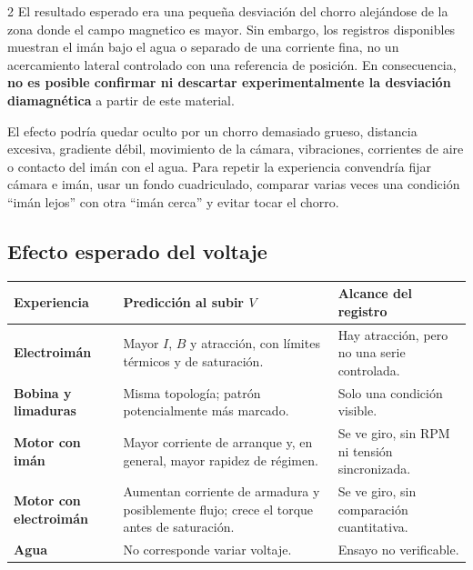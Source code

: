 \documentclass[10pt,letterpaper]{article}
\begin{document}
\begin{multicols}{2}
El resultado esperado era una pequeña desviación del chorro alejándose de la zona donde el campo magnetico es mayor. Sin embargo, los registros disponibles muestran el imán bajo el agua o separado de una corriente fina, no un acercamiento lateral controlado con una referencia de posición. En consecuencia, \textbf{no es posible confirmar ni descartar experimentalmente la desviación diamagnética} a partir de este material.


El efecto podría quedar oculto por un chorro demasiado grueso, distancia excesiva, gradiente débil, movimiento de la cámara, vibraciones, corrientes de aire o contacto del imán con el agua. Para repetir la experiencia convendría fijar cámara e imán, usar un fondo cuadriculado, comparar varias veces una condición ``imán lejos'' con otra ``imán cerca'' y evitar tocar el chorro.

\subsection{Efecto esperado del voltaje}

\begin{center}
\scriptsize
\begin{tabularx}{\columnwidth}{@{}>{\bfseries}p{}XX@{}}
\toprule
Experiencia & Predicción al subir $V$ & Alcance del registro \\
\midrule
Electroimán & Mayor $I$, $B$ y atracción, con límites térmicos y de saturación. & Hay atracción, pero no una serie controlada. \\
Bobina y limaduras & Misma topología; patrón potencialmente más marcado. & Solo una condición visible. \\
Motor con imán & Mayor corriente de arranque y, en general, mayor rapidez de régimen. & Se ve giro, sin RPM ni tensión sincronizada. \\
Motor con electroimán & Aumentan corriente de armadura y posiblemente flujo; crece el torque antes de saturación. & Se ve giro, sin comparación cuantitativa. \\
Agua & No corresponde variar voltaje. & Ensayo no verificable. \\
\bottomrule
\end{tabularx}
\label{tab:voltaje}
\end{center}


\end{multicols}
\end{document}
